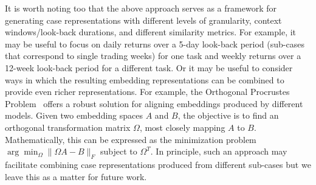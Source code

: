\documentclass[runningheads]{llncs}
\begin{document}
It is worth noting too that the above approach serves as a framework for generating case representations with different levels of granularity, context windows/look-back durations, and different similarity metrics. For example, it may be useful to focus on daily returns over a 5-day look-back period (sub-cases that correspond to single trading weeks) for one task and weekly returns over a 12-week look-back period for a different task. Or it may be useful to consider ways in which the resulting embedding representations can be combined to provide even richer representations. For example, the Orthogonal Procrustes Problem~\cite{schonemann1966generalized} offers a robust solution for aligning embeddings produced by different models. Given two embedding spaces $A$ and $B$, the objective is to find an orthogonal transformation matrix $\Omega$, most closely mapping $A$ to $B$. Mathematically, this can be expressed as the minimization problem $\arg\min_\Omega\|\Omega A-B\|_F$  subject to $\Omega^T$. In principle, such an approach may facilitate combining case representations produced from different sub-cases but we leave this as a matter for future work. 




\end{document}
